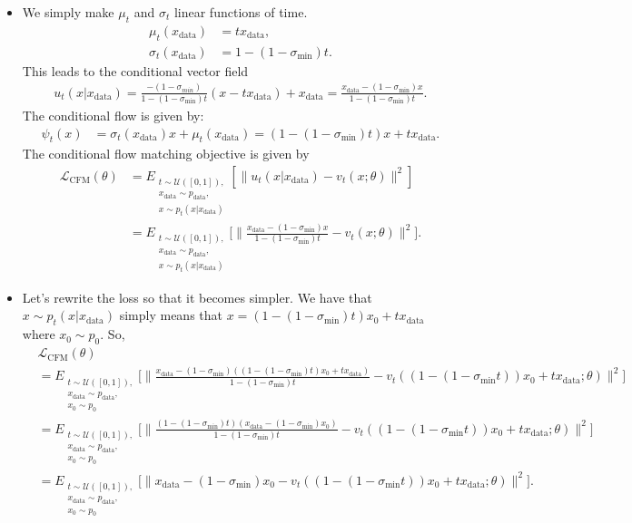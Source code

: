 \documentclass[10pt]{article}
\newcommand{\mrm}[1]{\mathrm{#1}}
\newcommand{\mcal}[1]{\mathcal{#1}}
\newcommand{\data}{\mathrm{data}}
\begin{document}
\begin{itemize}
  \item We simply make $\mu_t$ and $\sigma_t$ linear functions of time.
  \begin{align*}
    \mu_t(x_{\data}) &= t x_{\data}, \\
    \sigma_t(x_{\data}) &= 1 - (1-\sigma_{\min})t.
  \end{align*}
  This leads to the conditional vector field
  \begin{align*}
    u_t(x|x_{\data}) = \frac{-(1-\sigma_{min})}{1 - (1-\sigma_{\min}) t} (x - t x_{\data}) + x_{\data} = \frac{x_{\data} - (1-\sigma_{\min})x}{1 - (1-\sigma_{\min}) t}.
  \end{align*}
  The conditional flow is given by:
  \begin{align*}
    \psi_t(x) 
    &= \sigma_t(x_{\data})x + \mu_t(x_{\data})    
    = (1 - (1-\sigma_{\min})t) x + tx_{\data}.
  \end{align*}
  The conditional flow matching objective is given by
  \begin{align*}
    \mcal{L}_{\mrm{CFM}}(\theta) 
    &= E_{\substack{t \sim \mcal{U}([0,1]),\\ x_{\data} \sim p_{\data},\\ x \sim p_t(x|x_{\data})}} [\| u_t(x|x_{\data}) - v_t(x;\theta) \|^2] \\
    &= E_{\substack{t \sim \mcal{U}([0,1]),\\ x_{\data} \sim p_{\data},\\ x \sim p_t(x|x_{\data})}} \bigg[\bigg\| \frac{x_{\data} - (1-\sigma_{\min})x}{1 - (1-\sigma_{\min})t} - v_t(x;\theta) \bigg\|^2 \bigg].
  \end{align*}
  
  \item Let's rewrite the loss so that it becomes simpler. We have that $x \sim p_t(x|x_{\data})$ simply means that $x = (1-(1-\sigma_{\min})t)x_0 + tx_{\data}$ where $x_0 \sim p_0$. So,
  \begin{align*}
    &\mcal{L}_{\mrm{CFM}}(\theta) \\    
    &= E_{\substack{t \sim \mcal{U}([0,1]),\\ x_{\data} \sim p_{\data},\\ x_0 \sim p_0}} \bigg[\bigg\| \frac{x_{\data} - (1-\sigma_{\min})((1 - (1-\sigma_{\min})t) x_0 + t{x_{\data}})}{1 - (1-\sigma_{\min})t} - v_t( (1-(1-\sigma_{\min}t))x_0 + t x_{\data};\theta) \bigg\|^2 \bigg] \\
    &= E_{\substack{t \sim \mcal{U}([0,1]),\\ x_{\data} \sim p_{\data},\\ x_0 \sim p_0}} \bigg[\bigg\| \frac{(1 - (1-\sigma_{\min})t)(x_{\data} - (1-\sigma_{\min})x_0)}{1 - (1-\sigma_{\min})t} - v_t( (1-(1-\sigma_{\min}t))x_0 + t x_{\data};\theta) \bigg\|^2 \bigg] \\
    &= E_{\substack{t \sim \mcal{U}([0,1]),\\ x_{\data} \sim p_{\data},\\ x_0 \sim p_0}} \bigg[\bigg\| x_{\data} - (1-\sigma_{\min})x_0 - v_t( (1-(1-\sigma_{\min}t))x_0 + t x_{\data};\theta) \bigg\|^2 \bigg].
  \end{align*}


\end{itemize}
\end{document}
